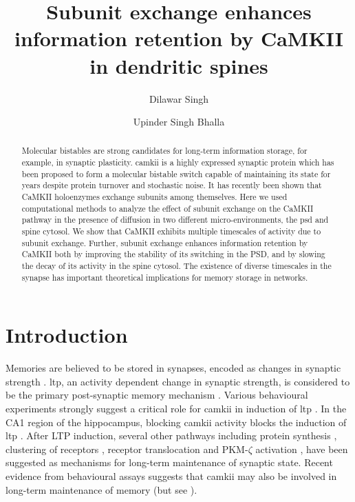 \documentclass[9pt,lineno,doublespacing]{elife}
\title{Subunit exchange enhances information retention by CaMKII in dendritic spines}
\author[]{Dilawar Singh}
\author[]{Upinder Singh Bhalla}
\affil[]{National Centre for Biological Sciences Bangalore, Tata Institute of Fundamental Research}
\begin{document}
\maketitle

\begin{abstract}\label{abstract} 

Molecular bistables are strong candidates for long-term information storage, for
example, in synaptic plasticity. \Gls{camkii} is a highly expressed synaptic
protein which has been proposed to form a molecular bistable switch capable of
maintaining its state for years despite protein turnover and stochastic noise.
It has recently been shown that CaMKII holoenzymes exchange subunits among
themselves. Here we used computational methods to analyze the effect of subunit
exchange on the CaMKII pathway in the presence of diffusion in two different
micro-environments, the \gls{psd} and spine cytosol. We show that CaMKII
exhibits multiple timescales of activity due to subunit exchange. Further,
subunit exchange enhances information retention by CaMKII both by improving the
stability of its switching in the PSD, and by slowing the decay of its activity
in the spine cytosol. The existence of diverse timescales in the synapse has
important theoretical implications for memory storage in networks.

\end{abstract}

\section{Introduction}\label{introduction}

Memories are believed to be stored in synapses, encoded as changes in synaptic
strength \citep{hebb_organization_2005,takeuchi_synaptic_2014,choi_interregional_2018}.
\gls{ltp}, an activity dependent change in synaptic strength, is considered to
be the primary post-synaptic memory mechanism
\citep{bliss_expression_2013,mayford_synapses_2012}. Various behavioural
experiments strongly suggest a critical role for \gls{camkii} in induction of
\gls{ltp} \citep{lucchesi_novel_2011,giese_autophosphorylation_1998}. In
the CA1 region of the hippocampus, blocking \gls{camkii} activity blocks the
induction of \gls{ltp} \citep{chang_camkii_2017}. After LTP induction, several
other pathways including protein synthesis \citep{aslam_translational_2009},
clustering of receptors \citep{shouval_clusters_2005}, receptor translocation
\citep{hayer_molecular_2005} and PKM-$\zeta$ activation
\citep{sacktor_memory_2012}, have been suggested as mechanisms for long-term
maintenance of synaptic state. Recent evidence from behavioural assays suggests
that \gls{camkii} may also be involved in long-term maintenance of memory
\citep{rossetti_memory_2017} (but see \citep{chang_camkii_2017}).
\end{document}

